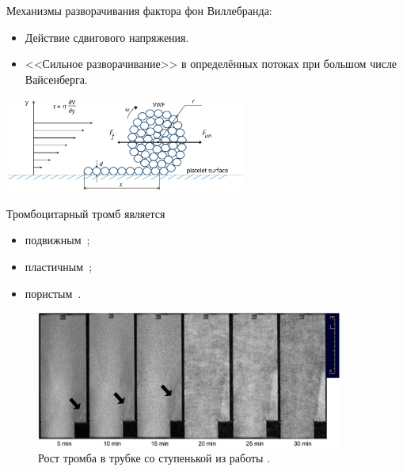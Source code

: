 \documentclass[
    14pt,
    xcolor=dvipsnames,
    aspectratio=169
]{beamer}
\begin{document}
\begin{frame}{\secname}
    Механизмы разворачивания фактора фон Виллебранда:
    \begin{itemize}
        \item Действие сдвигового напряжения.
        \item<1-> <<Сильное разворачивание>> в определённых потоках при большом числе Вайсенберга.
    \end{itemize}
    \begin{center}
        \includegraphics[width=0.6\textwidth]{./images/slides/vWF_unfolding.png}
    \end{center}
\end{frame}

\begin{frame}{\secname}
    Тромбоцитарный тромб является
    \begin{itemize}
        \item подвижным~\cite{savage1996platelet_adhesion,jamiolkowski2016visualization};
        \item пластичным~\cite{jamiolkowski2016visualization};
        \item пористым~\cite{wufsus2013clot_permeability}.
    \end{itemize}
\end{frame}

\begin{frame}{\secname}
    \begin{figure}[ht!]
        \includegraphics[width=0.9\textwidth]{./images/slides/yang_experiment.png}
        \caption{Рост тромба в трубке со ступенькой из работы \textcite{yang2021thrombosis_imaging}.}
    \end{figure}
\end{frame}
\end{document}
